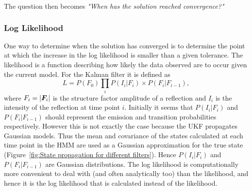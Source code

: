 The question then becomes \textit{"When has the solution reached convergence?"}

\subsubsection{Log Likelihood}
\label{subs:Log Likelihood}
One way to determine when the solution has converged is to determine the point at which the increase in the log likelihood is smaller than a given tolerance.
The likelihood is a function describing how likely the data observed are to occur given the current model.
For the Kalman filter it is defined as \cite{cressie2015statistics}
\begin{equation}
    L = P(F_0) \prod_i P(I_i | F_i) \times P( F_i | F_{i-1}),
    \label{eq:FBA likelihood function}
\end{equation}
where $F_i = |\boldsymbol{F}_i|$ is the structure factor amplitude of a reflection and $I_i$ is the intensity of the reflection at time point $i$.
Initially it seems that $P(I_i | F_i)$ and $P( F_i | F_{i-1})$ should represent the emission and transition probabilities respectively.
However this is not exactly the case because the UKF propagates Gaussian models.
Thus the mean and covariance of the states calculated at each time point in the HMM are used as a Gaussian approximation for the true state (Figure~\ref{fig:State propagation for different filters}).
Hence $P(I_i | F_i)$ and $P( F_i | F_{i-1})$ are Gaussian distributions.
The log likelihood is computationally more convenient to deal with (and often analytically too) than the likelihood, and hence it is the log likelihood that is calculated instead of the likelihood.

